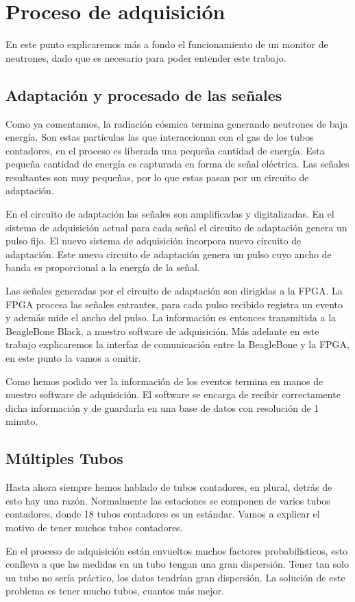 \section{Proceso de adquisición}
	En este punto explicaremos más a fondo el funcionamiento de un monitor de neutrones, dado que es necesario para poder entender este trabajo.
	\subsection{Adaptación y procesado de las señales}
		Como ya comentamos, la radiación cósmica termina generando neutrones de baja energía. Son estas partículas las que interaccionan con el gas de
		los tubos contadores, en el proceso es liberada una pequeña cantidad de energía. Esta pequeña cantidad de energía es capturada en forma de
		señal eléctrica. Las señales resultantes son muy pequeñas, por lo que estas pasan por un circuito de adaptación. 
		\par
		En el circuito de adaptación las señales son amplificadas y digitalizadas. En el sistema de adquisición actual para cada señal el circuito
		de adaptación genera un pulso fijo. El nuevo sistema de adquisición incorpora nuevo circuito de adaptación. Este nuevo circuito de
		adaptación genera un pulso cuyo ancho de banda es proporcional a la energía de la señal. 
		\par
		Las señales generadas por el circuito de adaptación son dirigidas a la FPGA. La FPGA procesa las señales entrantes, para cada pulso recibido
		registra un evento y además mide el ancho del pulso. La información es entonces transmitida a la BeagleBone Black, a nuestro software de
		adquisición. Más adelante en este trabajo explicaremos la interfaz de comunicación entre la BeagleBone y la FPGA, en este punto la vamos a omitir. 
		\par
		Como hemos podido ver la información de los eventos termina en manos de nuestro software de adquisición. El software se encarga de recibir
		correctamente dicha información y de guardarla en una base de datos con resolución de 1 minuto.
	\subsection{Múltiples Tubos}
		Hasta ahora siempre hemos hablado de tubos contadores, en plural, detrás de esto hay una razón. Normalmente las estaciones se componen de
		varios tubos contadores, donde 18 tubos contadores es un estándar. Vamos a explicar el motivo de tener muchos tubos contadores. 
		\par
		En el proceso de adquisición están envueltos muchos factores probabilísticos, esto conlleva a que las medidas en un tubo tengan una gran
		dispersión. Tener tan solo un tubo no sería práctico, los datos tendrían gran dispersión. La solución de este problema es tener mucho tubos,
		cuantos más mejor.
